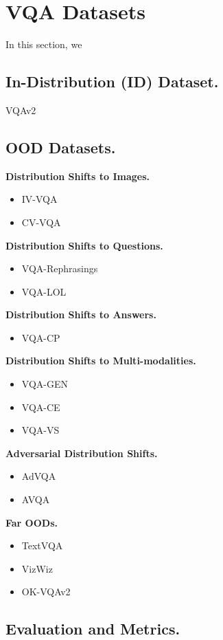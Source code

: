 \section{VQA Datasets}
In this section, we

\subsection{In-Distribution (ID) Dataset.}
VQAv2~\citep{goyal_making_2017}


\subsection{OOD Datasets.}

\textbf{Distribution Shifts to Images.}
\begin{itemize}
    \item IV-VQA~\citep{agarwal_towards_2020}
    \item CV-VQA~\citep{agarwal_towards_2020}
\end{itemize}

\textbf{Distribution Shifts to Questions.}
\begin{itemize}
    \item VQA-Rephrasings~\citep{shah_cycle-consistency_2019}
    \item VQA-LOL~\citep{gokhale_vqa-lol_2020}
\end{itemize}

\textbf{Distribution Shifts to Answers.}
\begin{itemize}
\item VQA-CP~\citep{agrawal_dont_2018}
\end{itemize}

\textbf{Distribution Shifts to Multi-modalities.}
\begin{itemize}
    \item VQA-GEN~\citep{unni_vqa-gen_2023}
    \item VQA-CE~\citep{dancette_beyond_2021}
    \item VQA-VS~\citep{si_language_2022}
\end{itemize}

\textbf{Adversarial Distribution Shifts.}
\begin{itemize}
    \item AdVQA~\citep{sheng_human-adversarial_2021}
    \item AVQA~\citep{li_adversarial_2021}
\end{itemize}

\textbf{Far OODs.}
\begin{itemize}
    \item TextVQA~\citep{singh_towards_2019}
    \item VizWiz~\citep{bigham_vizwiz_nodate}
    \item OK-VQAv2~\citep{reichman_outside_2023}
\end{itemize}




\subsection{Evaluation and Metrics.}